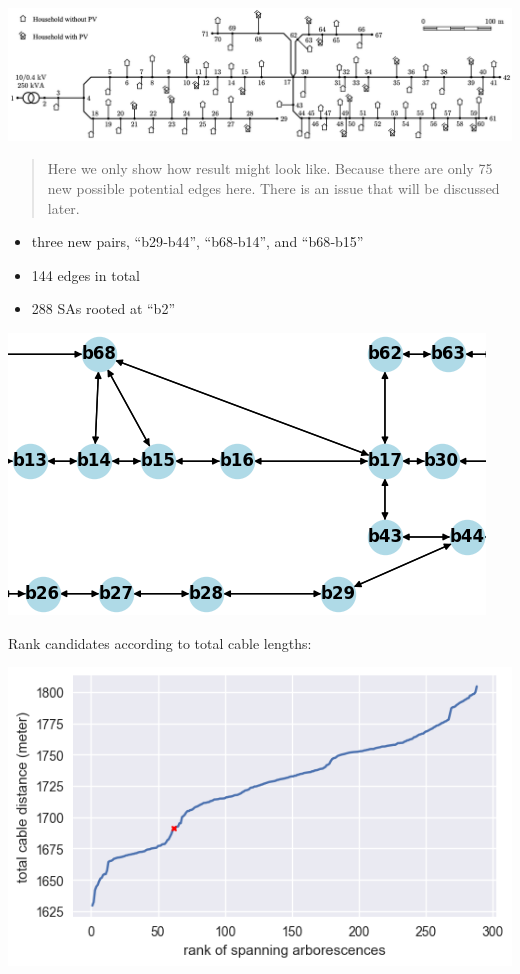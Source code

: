 \documentclass[
]{book}
\providecommand{\tightlist}{%
  \setlength{\itemsep}{0pt}\setlength{\parskip}{0pt}}
\begin{document}
\includegraphics{Pictures/case70true.png}

\begin{quote}
Here we only show how result might look like. Because there are only 75 new
possible potential edges here. There is an issue that will be discussed
later.
\end{quote}

\begin{itemize}
\tightlist
\item
  three new pairs, ``b29‐b44'', ``b68‐b14'', and ``b68‐b15''
\item
  144 edges in total
\item
  288 SAs rooted at ``b2''
\end{itemize}

\begin{center}\includegraphics[width=0.55\linewidth]{Pictures/case70} \end{center}

Rank candidates according to total cable lengths:

\begin{center}\includegraphics{Pictures/distances_288} \end{center}
\end{document}
